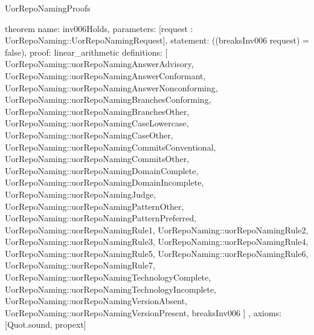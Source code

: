 \begin{lexlean}{UorRepoNamingProofs}
\begin{semanticmodule}
theorem{
  name: inv006Holds,
  parameters: [request : UorRepoNaming::UorRepoNamingRequest],
  statement: ((breaksInv006 request) = false),
  proof: linear_arithmetic{
    definitions: [
      UorRepoNaming::uorRepoNamingAnswerAdvisory,
      UorRepoNaming::uorRepoNamingAnswerConformant,
      UorRepoNaming::uorRepoNamingAnswerNonconforming,
      UorRepoNaming::uorRepoNamingBranchesConforming,
      UorRepoNaming::uorRepoNamingBranchesOther,
      UorRepoNaming::uorRepoNamingCaseLowercase,
      UorRepoNaming::uorRepoNamingCaseOther,
      UorRepoNaming::uorRepoNamingCommitsConventional,
      UorRepoNaming::uorRepoNamingCommitsOther,
      UorRepoNaming::uorRepoNamingDomainComplete,
      UorRepoNaming::uorRepoNamingDomainIncomplete,
      UorRepoNaming::uorRepoNamingJudge,
      UorRepoNaming::uorRepoNamingPatternOther,
      UorRepoNaming::uorRepoNamingPatternPreferred,
      UorRepoNaming::uorRepoNamingRule1,
      UorRepoNaming::uorRepoNamingRule2,
      UorRepoNaming::uorRepoNamingRule3,
      UorRepoNaming::uorRepoNamingRule4,
      UorRepoNaming::uorRepoNamingRule5,
      UorRepoNaming::uorRepoNamingRule6,
      UorRepoNaming::uorRepoNamingRule7,
      UorRepoNaming::uorRepoNamingTechnologyComplete,
      UorRepoNaming::uorRepoNamingTechnologyIncomplete,
      UorRepoNaming::uorRepoNamingVersionAbsent,
      UorRepoNaming::uorRepoNamingVersionPresent,
      breaksInv006
    ]
  },
  axioms: [Quot.sound, propext]
}
\end{semanticmodule}
\end{lexlean}
